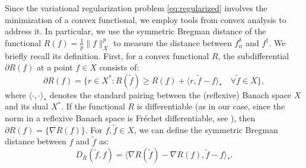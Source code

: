 \documentclass[11pt,a4paper]{article}
\numberwithin{equation}{section}
\def\fda{f^\delta_{\alpha}}
\begin{document}
Since the variational regularization problem \eqref{eq:regularized} involves the minimization of a convex functional, we employ 
tools from convex analysis to address it. In particular, we use the symmetric Bregman distance of the functional $R(f) = \frac{1}{p} \| f \|_X^p$ to measure the distance between $\fda$ and $f^\dag$. We briefly recall its definition. First, for a convex functional $R$, the subdifferential $\partial R(f)$ at a point $f \in X$ consists of:
\[
\partial R (f) = \{ r \in X^*: R(\tilde{f}) \geq R(f) + \langle r, \tilde{f}- f \rangle_* \quad \forall \tilde{f} \in X \},
\]
where $\langle\cdot,\cdot \rangle_*$ denotes the standard pairing between the (reflexive) Banach space $X$ and its dual $X^*$. If the functional $R$ is differentiable (as in our case, since the norm in a reflexive Banach space is Fr\'{e}chet differentiable, see \cite[Remark 2.38]{schuster2012regularization}), then $\partial R(f) = \{ \nabla R(f) \}$. For $f,\tilde{f} \in X$, 
we can define the symmetric Bregman distance between $f$ and $\tilde{f}$ as: 
\[
D_R(\tilde{f},f) = \langle \nabla R(\tilde{f}) - \nabla R(f), \tilde{f} - f \rangle_*.
\]
\end{document}
